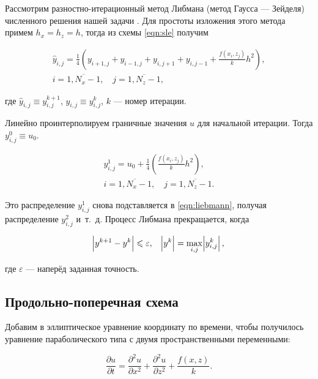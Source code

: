 \documentclass[12pt, a4paper]{article}
\begin{document}
Рассмотрим разностно-итерационный метод Либмана (метод Гаусса — Зейделя) численного решения нашей задачи \cite{2}.
Для простоты изложения этого метода примем $h_x = h_z = h$, тогда из схемы \eqref{eqn:sle} получим

\begin{equation}
	\label{eqn:liebmann}
	\begin{gathered}
		\hat y_{i, j} = \frac14 \left(y_{i+1, j} + y_{i-1,j} + y_{i, j+1} + y_{i, j-1} + \frac{f(x_i, z_j)}{k}h^2 \right), \\
		i = \overline{1, N_x-1}, \quad j = \overline{1, N_z - 1},
	\end{gathered}
\end{equation}

\noindent где $\hat y_{i, j} \equiv y_{i, j}^{k + 1}$, $y_{i, j} \equiv y_{i, j}^{k}$, $k$ — номер итерации.

Линейно проинтерполируем граничные значения $u$ для начальной итерации.
Тогда $y_{i, j}^0 \equiv u_0$.

\begin{equation}
	\begin{gathered}
		y_{i, j}^1 = u_0 + \frac14 \left(\frac{f(x_i, z_j)}{k}h^2 \right), \\
		i = \overline{1, N_x-1}, \quad j = \overline{1, N_z - 1}.
	\end{gathered}
\end{equation}

Это распределение $y_{i, j}^1$ снова подставляется в \eqref{eqn:liebmann}, получая распределение $y_{i, j}^2$ и~т.~д.
Процесс Либмана прекращается, когда

\begin{equation}
	\abs{y^{k+1} - y^k} \leqslant \varepsilon, \quad \abs{y^k} = \max_{i, j} \abs{y_{i, j}^k},
\end{equation}

\noindent где $\varepsilon$ — наперёд заданная точность.

\subsection{Продольно-поперечная схема}

Добавим в эллиптическое уравнение координату по времени, чтобы получилось уравнение параболического типа с двумя пространственными переменными:

\begin{equation}
	\frac{\partial u}{\partial t} = \frac{\partial^2 u}{\partial x^2} + \frac{\partial^2 u}{\partial z^2} + \frac{f(x, z)}{k}.
\end{equation}
\end{document}
